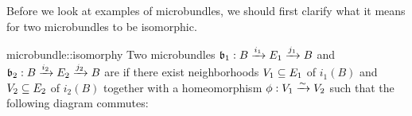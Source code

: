 \begin{myparagraph}
    Before we look at examples of microbundles, we should first clarify
    what it means for two microbundles to be isomorphic.
\end{myparagraph}

\begin{mydefinition}[isomorphy]{microbundle::isomorphy}
    Two microbundles $\bundledef{\bb_1}{B}{E_1}{i_1}{j_1}$ and $\bundledef{\bb_2}{B}{E_2}{i_2}{j_2}$ are  if
    there exist neighborhoods $V_1 \sub E_1$ of $i_1(B)$ and $V_2 \sub E_2$ of $i_2(B)$
    together with a homeomorphism $\phi: V_1 \isomto V_2$ such that the following diagram commutes: 
    \begin{center}
    \end{center}
\end{mydefinition}